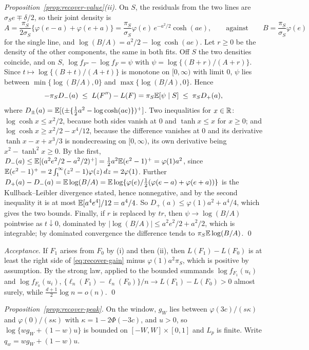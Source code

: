 \emph{Proposition~\ref{prop:recover-value}(ii).} On $S$, the residuals from the two lines are
$\sigma_Se\mp\delta/2$, so their joint density is
\[
A=\frac{\pi_S}{2\sigma_S}\bigl\{\varphi(e-a)+\varphi(e+a)\bigr\}
=\frac{\pi_S}{\sigma_S}\varphi(e)\,e^{-a^{2}/2}\cosh(ae),
\qquad\text{against}\qquad B=\frac{\pi_S}{\sigma_S}\varphi(e)
\]
for the single line, and $\log(B/A)=a^{2}/2-\log\cosh(ae)$. Let $r\ge0$ be the density of
the other components, the same in both fits. Off $S$ the two densities coincide, and on $S$,
$\log f_{F''}-\log f_F=\psi$ with $\psi=\log\{(B+r)/(A+r)\}$. Since
$t\mapsto\log\{(B+t)/(A+t)\}$ is monotone on $[0,\infty)$ with limit $0$, $\psi$ lies between
$\min\{\log(B/A),0\}$ and $\max\{\log(B/A),0\}$. Hence
\[
-\pi_SD_-(a)\;\le\;L(F'')-L(F)=\pi_S\mathbb{E}[\psi\mid S]\;\le\;\pi_SD_+(a),
\]
where $D_\pm(a)=\mathbb{E}[(\pm\{\tfrac12a^{2}-\log\cosh(ae)\})^{+}]$.
Two inequalities for $x\in\mathbb{R}$: $\log\cosh x\le x^{2}/2$, because both sides vanish at $0$ and
$\tanh x\le x$ for $x\ge0$; and $\log\cosh x\ge x^{2}/2-x^{4}/12$, because the difference
vanishes at $0$ and its derivative $\tanh x-x+x^{3}/3$ is nondecreasing on $[0,\infty)$, its
own derivative being $x^{2}-\tanh^{2}x\ge0$. By the first, $D_-(a)\le\mathbb{E}[(a^{2}e^{2}/2-a^{2}/2)^{+}]
=\tfrac12a^{2}\mathbb{E}(e^{2}-1)^{+}=\varphi(1)a^{2}$, since
$\mathbb{E}(e^{2}-1)^{+}=2\int_1^\infty(z^{2}-1)\varphi(z)\,dz=2\varphi(1)$. Further
$D_+(a)-D_-(a)=\mathbb{E}\log(B/A)=\mathbb{E}\log\{\varphi(e)/\tfrac12(\varphi(e-a)+\varphi(e+a))\}$ is the
Kullback--Leibler divergence stated, hence nonnegative, and by the second inequality it is at
most $\mathbb{E}[a^{4}e^{4}]/12=a^{4}/4$. So $D_+(a)\le\varphi(1)a^{2}+a^{4}/4$, which gives the two
bounds. Finally, if $r$ is replaced by $tr$, then $\psi\to\log(B/A)$ pointwise as
$t\downarrow0$, dominated by $|\log(B/A)|\le a^{2}e^{2}/2+a^{2}/2$, which is integrable; by
dominated convergence the difference tends to $\pi_S\mathbb{E}\log(B/A)$. \qed

\emph{Acceptance.} If $F_1$ arises from $F_0$ by (i) and then (ii), then
$L(F_1)-L(F_0)$ is at least the right side of \eqref{eq:recover-gain} minus
$\varphi(1)a^{2}\pi_S$, which is positive by assumption. By the strong law, applied to the
bounded summands $\log f_{F_1}(u_i)$ and $\log f_{F_0}(u_i)$,
$\{\ell_n(F_1)-\ell_n(F_0)\}/n\to L(F_1)-L(F_0)>0$ almost surely, while
$\tfrac{d+1}{2}\log n=o(n)$. \qed

\emph{Proposition~\ref{prop:recover-peak}.} On the window, $g_W$ lies between
$\varphi(3c)/(s\kappa)$ and $\varphi(0)/(s\kappa)$ with $\kappa=1-2\Phi(-3c)$, and $u>0$, so
$\log\{wg_W+(1-w)u\}$ is bounded on $[-W,W]\times[0,1]$ and $L_p$ is finite. Write
$q_w=wg_W+(1-w)u$.

